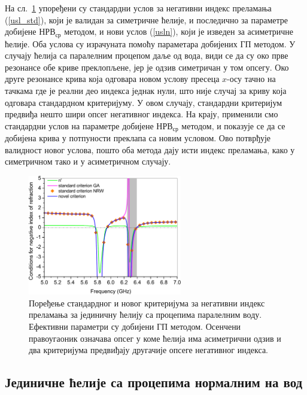 \documentclass[main.tex]{subfiles}
\begin{document}
На сл.~\ref{usl_par} упоређени су стандардни услов за негативни индекс преламања (\ref{usl_std}), који је валидан за симетричне ћелије, и последично за параметре добијене $НРВ_{ср}$ методом, и нови услов (\ref{usln}), који је изведен за асиметричне ћелије. Оба услова су израчуната помоћу параметара добијених ГП методом. У случају ћелија са паралелним процепом даље од вода, види се да су око прве резонансе обе криве преклопљене, јер је одзив симетричан у том опсегу. Око друге резонансе крива која одговара новом услову пресеца $x$-осу тачно на тачкама где је реални део индекса једнак нули, што није случај за криву која одговара стандардном критеријуму. У овом случају, стандардни критеријум предвиђа нешто шири опсег негативног индекса. На крају, применили смо стандардни услов на параметре добијене $НРВ_{ср}$ методом, и показује се да се добијена крива у потпуности преклапа са новим условом. Ово потврђује валидност новог услова, пошто оба метода дају исти индекс преламања, како у симетричном тако и у асиметричном случају.
\begin{figure}[!t]
\centering
\includegraphics[width=0.6\textwidth]{slike/usl_par.pdf}
\caption{Поређење стандардног и новог критеријума за негативни индекс преламања за јединичну ћелију са процепима паралелним воду. Ефективни параметри су добијени ГП методом. Осенчени правоугаоник означава опсег у коме ћелија има асиметрични одзив и два критеријума предвиђају другачије опсеге негативног индекса.}
\label{usl_par}
\end{figure} 
	
\subsection{Јединичне ћелије са процепима нормалним на вод}
\end{document}
